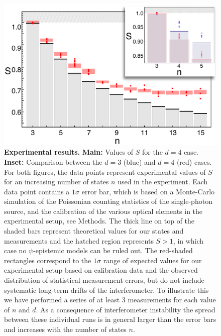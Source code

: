 \documentclass[aps,prl,floatfix,onecolumn,tightenlines,amsmath,amssymb,nofootinbib,12pt]{revtex4-2}
\begin{document}
\begin{figure}[h!]
\begin{center}
\includegraphics[width=\columnwidth]{Figure_3.pdf}
\end{center}
\vspace{-1.5em}
\caption{\textbf{Experimental results.} \textbf{Main:} Values of $S$ for the $d{=}4$ case. \textbf{Inset:} Comparison between the $d{=}3$ (blue) and $d{=}4$ (red) cases. For both figures, the data-points represent experimental values of $S$ for an increasing number of states $n$ used in the experiment. Each data point contains a $1\sigma$ error bar, which is based on a Monte-Carlo simulation of the Poissonian counting statistics of the single-photon source, and the calibration of the various optical elements in the experimental setup, see Methods. The thick line on top of the shaded bars represent theoretical values for our states and measurements and the hatched region represents $S>1$, in which case no $\psi$-epistemic models can be ruled out. The red-shaded rectangles correspond to the $1\sigma$ range of expected values for our experimental setup based on calibration data and the observed distribution of statistical measurement errors, but do not include systematic long-term drifts of the interferometer. To illustrate this we have performed a series of at least 3 measurements for each value of $n$ and $d$. As a consequence of interferometer instability the spread between these individual runs is in general larger than the error bars and increases with the number of states $n$.}
\vspace{-1em}
  \label{fig:results}
\end{figure}
\end{document}
